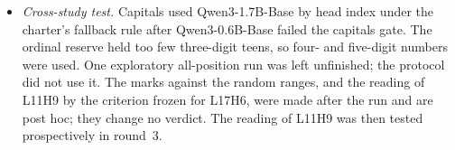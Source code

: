 \documentclass[11pt]{article}
\newcommand{\hd}[2]{L#1H#2}
\newcommand{\qsix}{Qwen3-0.6B-Base}
\newcommand{\qbig}{Qwen3-1.7B-Base}
\begin{document}
\begin{itemize}
\item \emph{Cross-study test.} Capitals used \qbig{} by head index under the charter's fallback rule after \qsix{} failed the capitals gate. The ordinal reserve held too few three-digit teens, so four- and five-digit numbers were used. One exploratory all-position run was left unfinished; the protocol did not use it. The marks against the random ranges, and the reading of \hd{11}{9} by the criterion frozen for \hd{17}{6}, were made after the run and are post hoc; they change no verdict. The reading of \hd{11}{9} was then tested prospectively in round~3.
\end{itemize}
\end{document}
